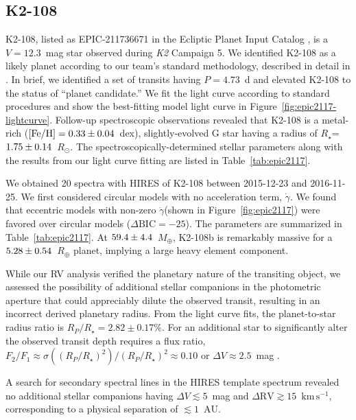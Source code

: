 \documentclass[preprint2]{aastex6}
\newcommand{\ktwo}{\textit{K2}\xspace}
\newcommand{\Rstar}{\ensuremath{R_{\star}}\xspace}
\newcommand{\fe}{\ensuremath{\mathrm{[Fe/H]}}\xspace}
\newcommand{\Rp}{\ensuremath{R_P}\xspace}
\newcommand{\kms}{\ensuremath{\mathrm{km}\,\mathrm{s}^{-1}}\xspace}
\newcommand{\AU}{\ensuremath{\mathrm{AU}}\xspace}
\newcommand{\Me}{\ensuremath{M_{\oplus}}\xspace}
\renewcommand{\Re}{\ensuremath{R_{\oplus}}\xspace}
\newcommand{\Rsun}{\ensuremath{R_{\odot}}\xspace }
\newcommand{\dvdt}{\ensuremath{\dot{\gamma}}\xspace}
\newcommand{\dbic}{\ensuremath{\Delta\mathrm{BIC}}\xspace}
\begin{document}
\subsection{K2-108}
\label{ssec:epic2117}
K2-108, listed as EPIC-211736671 in the Ecliptic Planet Input Catalog \citep{Huber16}, is a $V = 12.3$~mag star observed during \ktwo Campaign 5. We identified K2-108 as a likely planet according to our team's standard methodology, described in detail in \cite{Crossfield16}. In brief, we identified a set of transits having $P = 4.73$~d and elevated K2-108 to the status of ``planet candidate.'' We fit the light curve according to standard procedures and show the best-fitting model light curve in Figure~\ref{fig:epic2117-lightcurve}. Follow-up spectroscopic observations revealed that K2-108 is a metal-rich ($\fe = \val{epic2117-star}{fe}$~dex), slightly-evolved G star having a radius of \Rstar = $\val{epic2117-star}{radius}$~\Rsun. The spectroscopically-determined stellar parameters along with the results from our light curve fitting are listed in Table~\ref{tab:epic2117}. 

We obtained 20 spectra with HIRES of K2-108 between 2015-12-23 and 2016-11-25. We first considered circular models with no acceleration term, \dvdt. We found that eccentric models with non-zero \dvdt (shown in Figure~\ref{fig:epic2117}) were favored over circular models ($\dbic = -25$). The parameters are summarized in Table~\ref{tab:epic2117}. At $\val{epic2117-ecc}{Mpsini1}$~\Me, K2-108b is remarkably massive for a $\val{epic2117-ecc}{Rp1}$~\Re planet, implying a large heavy element component.

While our RV analysis verified the planetary nature of the transiting object, we assessed the possibility of additional stellar companions in the photometric aperture that could appreciably dilute the observed transit, resulting in an incorrect derived planetary radius.  From the light curve fits, the planet-to-star radius ratio is $\Rp/\Rstar = 2.82\pm0.17\%$. For an additional star to significantly alter the observed transit depth requires a flux ratio, $F_2/F_1 \approx \sigma\left(\left(\Rp/\Rstar\right)^2\right) / \left(\Rp/\Rstar\right)^2 \approx 0.10$ or $\Delta V \approx 2.5$~mag \citep{Ciardi15}.

A search for secondary spectral lines in the HIRES template spectrum \citep{kolbl:2015} revealed no additional stellar companions having $\Delta V \lesssim 5$~mag and $\Delta \mathrm{RV} \gtrsim 15$~\kms, corresponding to a physical separation of $\lesssim 1$~\AU. 
\end{document}
